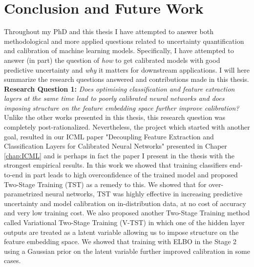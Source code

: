 \chapter{Conclusion and Future Work}
 Throughout my PhD and this thesis I have attempted to answer both methodological and more applied questions related to uncertainty quantification and calibration of machine learning models. Specifically, I have attempted to answer (in part) the question of \textit{how} to get calibrated models with good predictive uncertainty and \textit{why} it matters for downstream applications. I will here summarize the research questions answered and contributions made in this thesis. \\

 \noindent \textbf{Research Question 1:} \textit{Does optimising classification and feature extraction layers at the same time lead to poorly calibrated neural networks and does imposing structure on the feature embedding space further improve calibration?}\\

\noindent Unlike the other works presented in this thesis, this research question was completely post-rationalized. Nevertheless, the project which started with another goal, resulted in our ICML paper "Decoupling Feature Extraction and Classification Layers for Calibrated Neural Networks" presented in Chaper \ref{chap:ICML} and is perhaps in fact the paper I present in the thesis with the strongest empirical results. In this work we showed that training classifiers end-to-end in part leads to high overconfidence of the trained model and proposed Two-Stage Training (TST) as a remedy to this. We showed that for over-parametrized neural networks, TST was highly effective in increasing predictive uncertainty and model calibration on in-distribution data, at no cost of accuracy and very low training cost. We also proposed another Two-Stage Training method called Variational Two-Stage Training (V-TST) in which one of the hidden layer outputs are treated as a latent variable allowing us to impose structure on the feature embedding space. We showed that training with ELBO in the Stage 2 using a Gaussian prior on the latent variable further improved calibration in some cases. \\

